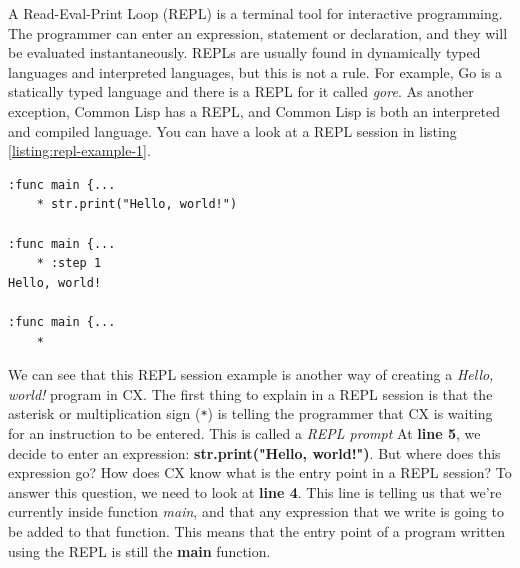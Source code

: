 \documentclass[11pt,fleqn,openany]{book} %
\begin{document}

A Read-Eval-Print Loop (REPL) is a terminal tool for interactive programming. The programmer can enter an expression, statement or declaration, and they will be evaluated instantaneously. REPLs are usually found in dynamically typed languages and interpreted languages, but this is not a rule. For example, Go is a statically typed language and there is a REPL for it called \emph{gore}. As another exception, Common Lisp has a REPL, and Common Lisp is both an interpreted and compiled language. You can have a look at a REPL session in listing \ref{listing:repl-example-1}.


\begin{lstlisting}[caption={REPL session example},captionpos=b,label={listing:repl-example-1}]
:func main {...
	* str.print("Hello, world!")

:func main {...
	* :step 1
Hello, world!

:func main {...
	* 
\end{lstlisting}

We can see that this REPL session example is another way of creating a \textit{Hello, world!} program in CX. The first thing to explain in a REPL session is that the asterisk or multiplication sign (\lstinline{*}) is telling the programmer that CX is waiting for an instruction to be entered. This is called a \textit{REPL prompt} At \textbf{line 5}, we decide to enter an expression: \textbf{str.print("Hello, world!")}. But where does this expression go? How does CX know what is the entry point in a REPL session? To answer this question, we need to look at \textbf{line 4}. This line is telling us that we're currently inside function \emph{main}, and that any expression that we write is going to be added to that function. This means that the entry point of a program written using the REPL is still the \textbf{main} function.
\end{document}
